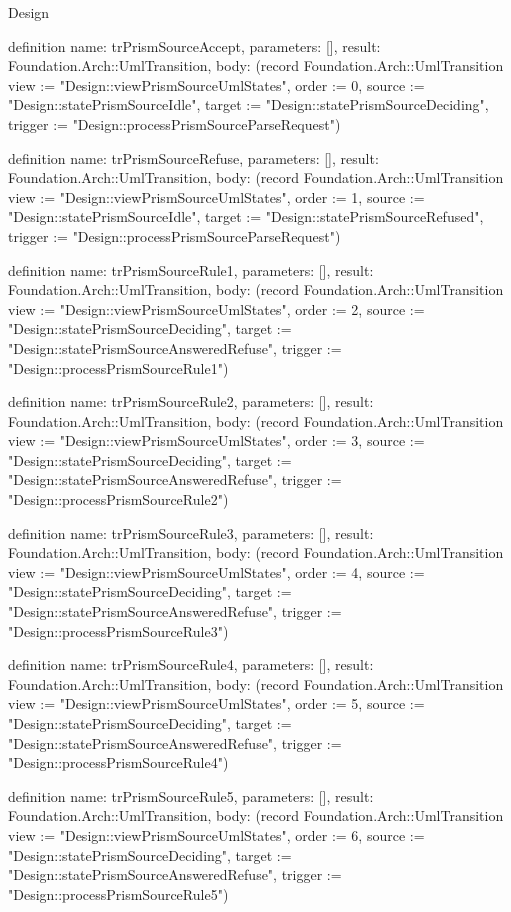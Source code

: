 \begin{lexlean}{Design}
\begin{semanticmodule}
definition{
  name: trPrismSourceAccept,
  parameters: [],
  result: Foundation.Arch::UmlTransition,
  body: (record Foundation.Arch::UmlTransition {view := "Design::viewPrismSourceUmlStates", order := 0, source := "Design::statePrismSourceIdle", target := "Design::statePrismSourceDeciding", trigger := "Design::processPrismSourceParseRequest"})
}

definition{
  name: trPrismSourceRefuse,
  parameters: [],
  result: Foundation.Arch::UmlTransition,
  body: (record Foundation.Arch::UmlTransition {view := "Design::viewPrismSourceUmlStates", order := 1, source := "Design::statePrismSourceIdle", target := "Design::statePrismSourceRefused", trigger := "Design::processPrismSourceParseRequest"})
}

definition{
  name: trPrismSourceRule1,
  parameters: [],
  result: Foundation.Arch::UmlTransition,
  body: (record Foundation.Arch::UmlTransition {view := "Design::viewPrismSourceUmlStates", order := 2, source := "Design::statePrismSourceDeciding", target := "Design::statePrismSourceAnsweredRefuse", trigger := "Design::processPrismSourceRule1"})
}

definition{
  name: trPrismSourceRule2,
  parameters: [],
  result: Foundation.Arch::UmlTransition,
  body: (record Foundation.Arch::UmlTransition {view := "Design::viewPrismSourceUmlStates", order := 3, source := "Design::statePrismSourceDeciding", target := "Design::statePrismSourceAnsweredRefuse", trigger := "Design::processPrismSourceRule2"})
}

definition{
  name: trPrismSourceRule3,
  parameters: [],
  result: Foundation.Arch::UmlTransition,
  body: (record Foundation.Arch::UmlTransition {view := "Design::viewPrismSourceUmlStates", order := 4, source := "Design::statePrismSourceDeciding", target := "Design::statePrismSourceAnsweredRefuse", trigger := "Design::processPrismSourceRule3"})
}

definition{
  name: trPrismSourceRule4,
  parameters: [],
  result: Foundation.Arch::UmlTransition,
  body: (record Foundation.Arch::UmlTransition {view := "Design::viewPrismSourceUmlStates", order := 5, source := "Design::statePrismSourceDeciding", target := "Design::statePrismSourceAnsweredRefuse", trigger := "Design::processPrismSourceRule4"})
}

definition{
  name: trPrismSourceRule5,
  parameters: [],
  result: Foundation.Arch::UmlTransition,
  body: (record Foundation.Arch::UmlTransition {view := "Design::viewPrismSourceUmlStates", order := 6, source := "Design::statePrismSourceDeciding", target := "Design::statePrismSourceAnsweredRefuse", trigger := "Design::processPrismSourceRule5"})
}


\end{semanticmodule}
\end{lexlean}
